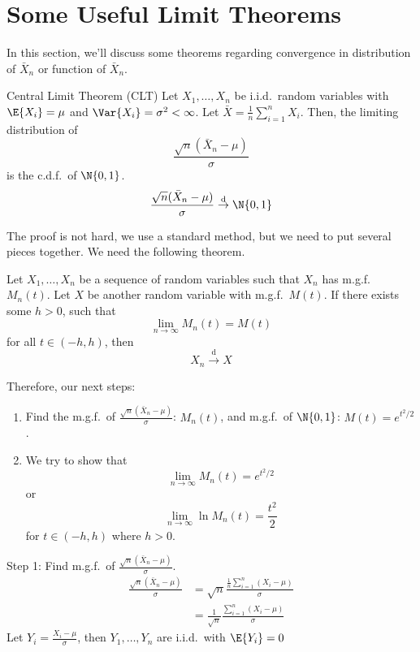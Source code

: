 \section{Some Useful Limit Theorems}
In this section, we'll discuss some theorems
regarding convergence in distribution of $ \bar{X}_n $
or function of $ \bar{X}_n $.
\begin{Theorem}{Central Limit Theorem (CLT)}{}
    Let $ X_1,\ldots,X_n $
    be i.i.d.\ random variables with $ \E{X_i}=\mu $
    and $ \Var{X_i}=\sigma^2<\infty $. Let
    $ \bar{X}=\frac{1}{n} \sum_{i=1}^{n} X_i $. Then,
    the limiting distribution of
    \[ \frac{\sqrt{n}(\bar{X}_n-\mu)}{\sigma} \]
    is the c.d.f.\ of $ \N{0,1} $.
    \[  \frac{\sqrt{n}(\bar{X}_n-\mu)}{\sigma}
        \stackrel{\text{d}}{\to}\N{0,1} \]
\end{Theorem}
The proof is not hard, we use a standard method,
but we need to put several pieces together.
We need the following theorem.
\begin{Theorem}{}{}
    Let $ X_1,\ldots,X_n $ be a sequence of
    random variables such that $ X_n $ has
    m.g.f.\ $ M_n(t) $. Let $ X $
    be another random variable with m.g.f.\
    $ M(t) $. If there exists some $ h>0 $, such that
    \[ \lim\limits_{{n} \to {\infty}} M_n(t)=M(t) \]
    for all $ t\in(-h,h) $, then
    \[ X_n \stackrel{\text{d}}{\to} X \]
\end{Theorem}
Therefore, our next steps:
\begin{enumerate}[label=(\arabic*)]
    \item Find the m.g.f.\ of
          $ \frac{\sqrt{n}(\bar{X}_n-\mu)}{\sigma} $: $ M_n(t) $,
          and m.g.f.\ of $ \N{0,1} $: $ M(t)=e^{t^2/2} $.
    \item We try to show that
          \[ \lim\limits_{{n} \to {\infty}}M_n(t)=e^{t^2/2}  \]
          or
          \[ \lim\limits_{{n} \to {\infty}} \ln{M_n(t)}=\frac{t^2}{2} \]
          for $ t\in(-h,h) $ where $ h>0 $.
\end{enumerate}
Step 1: Find m.g.f.\ of $ \displaystyle \frac{\sqrt{n}(\bar{X}_n-\mu)}{\sigma} $.
\begin{align*}
    \frac{\sqrt{n}(\bar{X}_n-\mu)}{\sigma}
     & =\sqrt{n}\frac{\frac{1}{n} \sum_{i=1}^{n} (X_i-\mu)}{\sigma} \\
     & =\frac{1}{\sqrt{n}} \frac{\sum_{i=1}^{n} (X_i-\mu)}{\sigma}
\end{align*}
Let $ \displaystyle Y_i=\frac{X_i-\mu}{\sigma} $, then
$ Y_1,\ldots,Y_n $ are i.i.d.\ with $ \E{Y_i}=0 $

